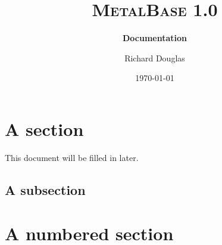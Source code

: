 \documentclass{article}[12pt,a4paper]
\title{\textsc{MetalBase 1.0}}
\subtitle{\textbf{Documentation}}
\author{\Large{Richard Douglas}}
\date{\today{}}
\begin{document}
  \maketitle
  
  \section*{A section}
  This document will be filled in later.
  
  \subsection*{A subsection}
  
  \tableofcontents
  
  \pagebreak
  
  \section{A numbered section}
\end{document}
